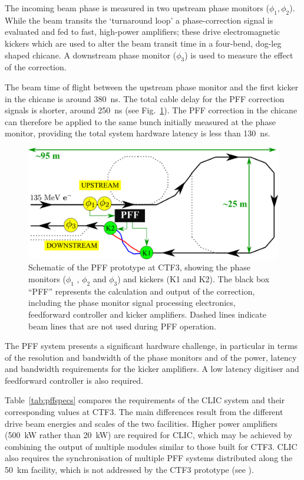 \documentclass[%
 reprint,
 superscriptaddress,
 amsmath,
 amssymb,
 prl,
]{revtex4-1}
\begin{document}
The incoming beam phase is measured in two upstream phase 
monitors (\(\phi_{1}, \phi_{2}\)). While the beam 
transits the ‘turnaround loop’ a phase-correction signal is evaluated and fed 
to fast, high-power amplifiers; these drive electromagnetic kickers which are 
used to alter the beam transit time in a four-bend, dog-leg 
shaped chicane. A downstream phase monitor (\(\phi_{3}\)) is 
used to measure the effect of the correction. 

The beam time of flight between the upstream phase monitor and the first kicker 
in the chicane is around 380~ns. The 
total cable delay for the PFF correction signals 
is shorter, around 250~ns (see Fig.~\ref{fig:pffLayout}). The PFF correction in 
the chicane can therefore be applied to the same bunch initially measured at 
the phase monitor, providing the total system hardware latency is less than 
130~ns. 
 

\begin{figure}
	\includegraphics[width=\columnwidth]{figs/ctfpffLayout}%
	\caption{\label{fig:pffLayout}Schematic of the PFF prototype at CTF3, 
	showing the phase monitors (\(\phi_1\) , 
	\(\phi_2\) and \(\phi_3\)) and kickers (K1 and K2). The black box “PFF” 
	represents the calculation and output of the correction, including the 
	phase monitor signal processing electronics, feedforward controller and 
	kicker amplifiers.
	Dashed lines indicate beam lines that are not used during PFF operation. 
		}
\end{figure}

The PFF system presents a significant hardware challenge, in particular in 
terms of the resolution and bandwidth of the phase monitors and of the power, 
latency and bandwidth requirements for the kicker 
amplifiers. A low latency digitiser and feedforward controller is also required.

Table~\ref{tab:pffspecs} compares the requirements of the CLIC system and their 
corresponding values at CTF3. 
The main differences result from the different drive beam energies and scales 
of the two facilities. Higher power amplifiers (500~kW rather than 20~kW) are 
required for CLIC, which may be achieved by combining the output of multiple 
modules similar to those built for CTF3. CLIC also requires the 
synchronisation of multiple PFF systems distributed along the 50~km facility, 
which is not addressed by the CTF3 prototype (see \cite{CLICCDR}).
\end{document}

